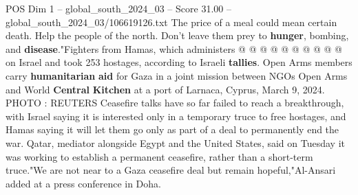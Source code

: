 \begin{textsample}{POS Dim 1 – global\_south\_2024\_03 – Score 31.00 – global\_south\_2024\_03/106619126.txt}
The price of a meal could mean certain death.
Help the people of the north.
Don't leave them prey to \textbf{hunger}, bombing, and \textbf{disease}."Fighters from Hamas, which administers @ @ @ @ @ @ @ @ @ @ on Israel and took 253 hostages, according to Israeli \textbf{tallies}.
Open Arms members carry \textbf{humanitarian} \textbf{aid} for Gaza in a joint mission between NGOs Open Arms and World \textbf{Central} \textbf{Kitchen} at a port of Larnaca, Cyprus, March 9, 2024.
PHOTO : REUTERS Ceasefire talks have so far failed to reach a breakthrough, with Israel saying it is interested only in a temporary truce to free hostages, and Hamas saying it will let them go only as part of a deal to permanently end the war.
Qatar, mediator alongside Egypt and the United States, said on Tuesday it was working to establish a permanent ceasefire, rather than a short-term truce."We are not near to a Gaza ceasefire deal but remain hopeful,"Al-Ansari added at a press conference in Doha.

\end{textsample}
